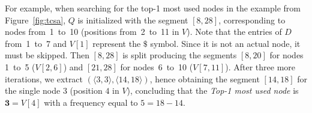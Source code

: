\begin{itemize}[leftmargin=3mm]
\begin{itemize}
For example, when searching for the top-1 most used nodes in the example from Figure~\ref{fig:tcsa}, $Q$ is initialized with
the segment $[8, 28]$, corresponding to nodes from~1~to~10 (positions from~2~to~11 in $V$). Note
that the entries of $D$ from~1~to~7 and $V[1]$ represent the $\$$ symbol. Since it is not an actual node, it
 must be skipped. Then $[8, 28]$ is split producing the segments $[8, 20]$ for nodes 1~to~5 ($V[2,6]$)
and $[21, 28]$ for nodes~6~to~10 ($V[7,11]$). After three more iterations, we extract
$(\langle 3,3\rangle, \langle 14,18\rangle)$, hence obtaining the segment $[14, 18]$ for
the single node 3 (position $4$ in $V$), concluding that the  {\em Top-1 most used node} is 
$\mathbf{3}=V[4]$ with a frequency equal to $5=18-14$.



%	
%	


\end{itemize}
\end{itemize}
